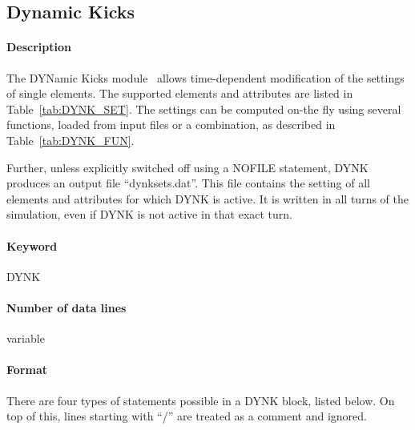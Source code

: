 \documentclass[a4paper,11pt]{report}
\begin{document}
\subsection{Dynamic Kicks}
\label{sec:DYNK}

\paragraph{Description}
The DYNamic Kicks module~\cite{DYNKpaper} allows time-dependent modification of the settings of single elements.
The supported elements and attributes are listed in Table~\ref{tab:DYNK_SET}.
The settings can be computed on-the fly using several functions, loaded from input files or a combination, as described in Table~\ref{tab:DYNK_FUN}.

Further, unless explicitly switched off using a NOFILE statement, DYNK produces an output file ``dynksets.dat''.
This file contains the setting of all elements and attributes for which DYNK is active.
It is written in all turns of the simulation, even if DYNK is not active in that exact turn.

\paragraph{Keyword} DYNK

\paragraph{Number of data lines} variable

\paragraph{Format}
There are four types of statements possible in a DYNK block, listed below.
On top of this, lines starting with ``/'' are treated as a comment and ignored.
\end{document}
